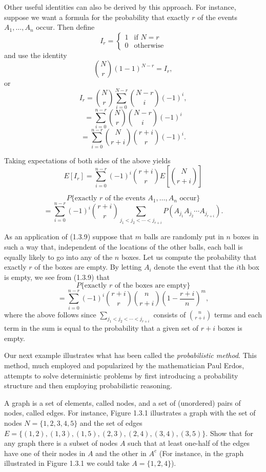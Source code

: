 \documentclass[lang=cn,10pt,thmcnt=section]{elegantbook}
\begin{document}
Other useful identities can also be derived by this approach. For instance, suppose we want a formula for the probability that exactly \(r\) of the events \(A_1, \ldots, A_n\) occur. Then define
\[
I_r = \begin{cases}
1 & \text{if } N = r \\
0 & \text{otherwise}
\end{cases}
\]
and use the identity
\[
\binom{N}{r} (1 - 1)^{N - r} = I_r,
\]
or
\[
I_r = \binom{N}{r} \sum_{i=0}^{N - r} \binom{N - r}{i} (-1)^i,
\]
\[
= \sum_{i=0}^{n - r} \binom{N}{r} \binom{N - r}{i} (-1)^i
\]
\[
= \sum_{i=0}^{n - r} \binom{N}{r + i} \binom{r + i}{r} (-1)^i.
\]

Taking expectations of both sides of the above yields
\[
E[I_r] = \sum_{i=0}^{n - r} (-1)^i \binom{r + i}{r} E\left[\binom{N}{r + i}\right]
\]

\begin{equation}
P\{\text{exactly } r \text{ of the events } A_1, \ldots, A_n \text{ occur}\}
\end{equation}
\[
= \sum_{i=0}^{n - r} (-1)^i \binom{r + i}{r} \sum_{j_1 < j_2 < \cdots < j_{r + i}} P(A_{j_1} A_{j_2} \cdots A_{j_{r + i}}).
\]

As an application of (1.3.9) suppose that \(m\) balls are randomly put in \(n\) boxes in such a way that, independent of the locations of the other balls, each ball is equally likely to go into any of the \(n\) boxes. Let us compute the probability that exactly \(r\) of the boxes are empty. By letting \(A_i\) denote the event that the \(i\)th box is empty, we see from (1.3.9) that
\[
P\{\text{exactly } r \text{ of the boxes are empty}\}
\]
\[
= \sum_{i=0}^{n - r} (-1)^i \binom{r + i}{r} \binom{n}{r + i} \left(1 - \frac{r + i}{n}\right)^m,
\]
where the above follows since \(\sum_{j_1 < j_2 < \cdots < j_{r + i}}\) consists of \(\binom{n}{r + i}\) terms and each term in the sum is equal to the probability that a given set of \(r + i\) boxes is empty.

Our next example illustrates what has been called the \textit{probabilistic method}. This method, much employed and popularized by the mathematician Paul Erdos, attempts to solve deterministic problems by first introducing a probability structure and then employing probabilistic reasoning.

\begin{example}
	A graph is a set of elements, called nodes, and a set of (unordered) pairs of nodes, called edges. For instance, Figure 1.3.1 illustrates a graph with the set of nodes \( N = \{1, 2, 3, 4, 5\} \) and the set of edges
	 \( E = \{(1, 2), (1, 3), (1, 5), (2, 3), (2, 4), (3, 4), (3, 5)\} \). Show that for any graph there is a subset of nodes \( A \) such that at least one-half of the edges have one of their nodes in \( A \) and the other in \( A^c \) (For instance, in the graph illustrated in Figure 1.3.1 we could take \( A = \{1, 2, 4\} \)).
\end{example}
\end{document}
